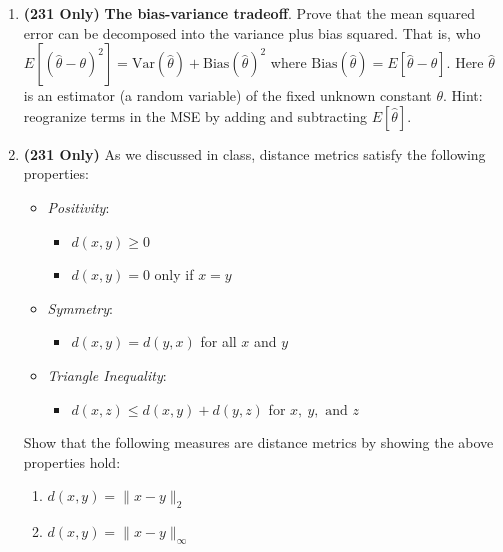 \documentclass[]{article}
\providecommand{\tightlist}{%
  \setlength{\itemsep}{0pt}\setlength{\parskip}{0pt}}
\begin{document}
\begin{enumerate}
\def\labelenumi{\arabic{enumi}.}
\setcounter{enumi}{6}
\item
  \textbf{(231 Only)} \textbf{The bias-variance tradeoff}. Prove that
  the mean squared error can be decomposed into the variance plus bias
  squared. That is, who
  \(E[(\hat \theta - \theta)^2] = \text{Var}(\hat \theta) + \text{Bias}(\hat \theta )^2\)
  where \(\text{Bias}(\hat \theta) = E[\hat \theta - \theta]\). Here
  \(\hat \theta\) is an estimator (a random variable) of the fixed
  unknown constant \(\theta\). Hint: reogranize terms in the MSE by
  adding and subtracting \(E[\hat \theta]\).
\item
  \textbf{(231 Only)} As we discussed in class, distance metrics satisfy
  the following properties:

  \begin{itemize}
  \item
    \emph{Positivity}:

    \begin{itemize}
    \tightlist
    \item
      \(d(x,y)\geq 0\)
    \item
      \(d(x,y) = 0\) only if \(x=y\)
    \end{itemize}
  \item
    \emph{Symmetry}:

    \begin{itemize}
    \tightlist
    \item
      \(d(x,y) = d(y,x)\) for all \(x\) and \(y\)
    \end{itemize}
  \item
    \emph{Triangle Inequality}:

    \begin{itemize}
    \tightlist
    \item
      \(d(x,z) \leq d(x,y) + d(y,z)\) for \(x,\ y,\text{ and } z\)
    \end{itemize}
  \end{itemize}

  Show that the following measures are distance metrics by showing the
  above properties hold:

  \begin{enumerate}
  \item
    \(d(x,y) = \|x-y\|_2\)
  \item
    \(d(x,y) = \|x-y\|_\infty\)
  \end{enumerate}
\end{enumerate}
\end{document}
